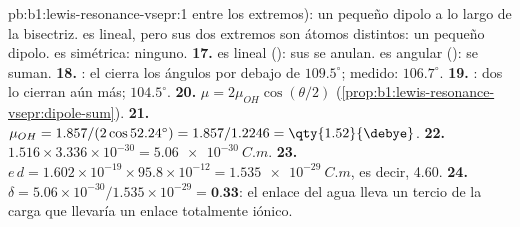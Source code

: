 \begin{solution}{pb:b1:lewis-resonance-vsepr:1}
entre los extremos): un pequeño dipolo a lo largo de la bisectriz.
 es lineal, pero sus dos extremos son átomos distintos: un
pequeño dipolo.  es simétrica: ninguno.
\textbf{17.}  es lineal (): sus  se
anulan.  es angular (): se suman.
\textbf{18.} : el  cierra los ángulos por debajo
de $109.5^\circ$; medido: $106.7^\circ$.
\textbf{19.} : dos  lo cierran aún más;
$104.5^\circ$.
\textbf{20.} $\mu = 2\mu_{OH}\cos(\theta/2)$
(\cref{prop:b1:lewis-resonance-vsepr:dipole-sum}).
\textbf{21.} $\mu_{OH} = 1.857/(2\cos 52.24^\circ) = 1.857/1.2246 =
\qty{1.52}{\debye}$.
\textbf{22.} $1.516 \times 3.336 \times 10^{-30} = \qty{5.06e-30}{C.m}$.
\textbf{23.} $e\,d = 1.602 \times 10^{-19} \times 95.8 \times 10^{-12} =
\qty{1.535e-29}{C.m}$, es decir, \qty{4.60}{\debye}.
\textbf{24.} $\delta = 5.06 \times 10^{-30}/1.535 \times 10^{-29} =
\textbf{0.33}$: el enlace  del agua lleva un tercio de la carga
que llevaría un enlace totalmente iónico.
\end{solution}
